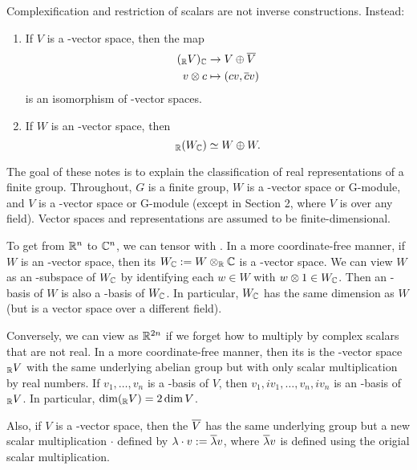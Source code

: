 \documentclass{scrartcl}
\begin{document}
Complexification and restriction of scalars are not inverse constructions. Instead:
\begin{proposition}
    \hfill
    \begin{enumerate}[font=\normalfont]
        \item If $V$ is a \CC-vector space, then the map \begin{align*}
            (_{\mathbb R} V)_{\mathbb C} &\rightarrow V \oplus \overline{V} \\
            v\otimes c &\mapsto (cv,\overline{c}v) \\
        \end{align*} is an isomorphism of \CC-vector spaces.
        \item If $W$ is an \RR-vector space, then \[_{\mathbb R}(W_{\mathbb C}) \simeq W\oplus W.\]
    \end{enumerate}
\end{proposition}

\newpset


The goal of these notes is to explain the classification of real representations of a finite
group. Throughout, $G$ is a finite group, $W$ is a \RR-vector space or \RR G-module, and $V$ is a
\CC-vector space or \CC G-module (except in Section 2, where $V$ is over any field). Vector spaces
and representations are assumed to be finite-dimensional.

To get from $\mathbb R^n$ to $\mathbb C^n$, we can tensor with \CC. In a more coordinate-free
manner, if $W$ is an \RR-vector space, then its  $W_{\mathbb C} := W \otimes_{\mathbb R} \mathbb C$ is a \CC-vector
space. We can view $W$ as an \RR-subspace of $W_{\mathbb C}$ by identifying each $w \in W$ with $w \otimes 1 \in W_{\mathbb C}$.
Then an \RR-basis of $W$ is also a \CC-basis of $W_{\mathbb C}$. In particular, $W_{\mathbb C}$ has the same dimension as
$W$ (but is a vector space over a different field).

Conversely, we can view \CCn as $\mathbb R^{2n}$ if we forget how to multiply by complex scalars that are not real. In a more coordinate-free manner, then its  is the \RR-vector space $_{\mathbb R} V$ with the same underlying abelian group but with only scalar multiplication by real numbers. If $v_1,\dots,v_n$ is a \CC-basis of $V$, then $v_1, iv_1,\dots,v_n,iv_n$ is an \RR-basis of $_{\mathbb R} V$. In particular, $\dim(_{\mathbb R} V) = 2\dim V$.

Also, if $V$ is a \CC-vector space, then the  $\overline{V}$ has the same underlying group but a new scalar multiplication $\cdot$ defined by $\lambda\cdot v := \overline{\lambda}v$, where $\overline{\lambda}v$ is defined using the origial scalar multiplication.
\end{document}
